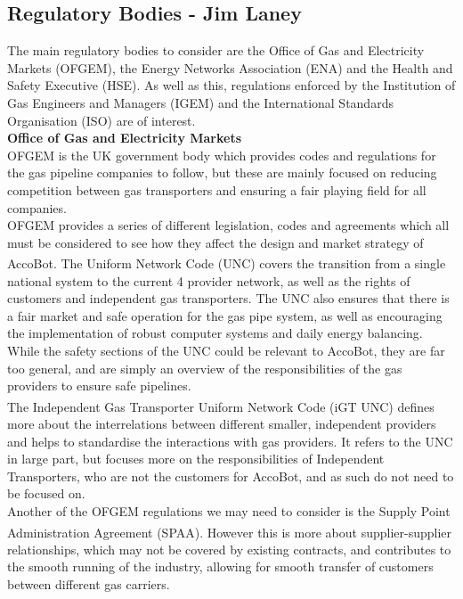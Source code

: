 \documentclass[11pt]{article}		%
\newcommand{\supercite}[1]{\textsuperscript{\cite{#1}}}		%
\begin{document}
		\subsection[Regulatory Bodies]{Regulatory Bodies - Jim Laney}
			
			The main regulatory bodies to consider are the Office of Gas and Electricity Markets (OFGEM), the Energy Networks Association (ENA) and the Health and Safety Executive (HSE).
			As well as this, regulations enforced by the Institution of Gas Engineers and Managers (IGEM) and the International Standards Organisation (ISO) are of interest.
 			\\
 			\textbf{Office of Gas and Electricity Markets}
 			\\
			OFGEM is the UK government body which provides codes and regulations for the gas pipeline companies to follow, but these are mainly focused on reducing competition between gas transporters and ensuring a fair playing field for all companies.
			\\
			OFGEM provides a series of different legislation, codes and agreements which all must be considered to see how they affect the design and market strategy of AccoBot.
			The Uniform Network Code (UNC)\supercite{joint2005uniform} covers the transition from a single national system to the current 4 provider network, as well as the rights of customers and independent gas transporters.
			The UNC also ensures that there is a fair market and safe operation for the gas pipe system, as well as encouraging the implementation of robust computer systems and daily energy balancing.
			While the safety sections of the UNC could be relevant to AccoBot, they are far too general, and are simply an overview of the responsibilities of the gas providers to ensure safe pipelines.
			\\
			The Independent Gas Transporter Uniform Network Code (iGT UNC)\supercite{igt2021independent} defines more about the interrelations between different smaller, independent providers and helps to standardise the interactions with gas providers.
			It refers to the UNC in large part, but focuses more on the responsibilities of Independent Transporters, who are not the customers for AccoBot, and as such do not need to be focused on.
			\\
			Another of the OFGEM regulations we may need to consider is the Supply Point Administration Agreement (SPAA)\supercite{spaa2021supply}. 
			However this is more about supplier-supplier relationships, which may not be covered by existing contracts, and contributes to the smooth running of the industry, allowing for smooth transfer of customers between different gas carriers.
\end{document}
